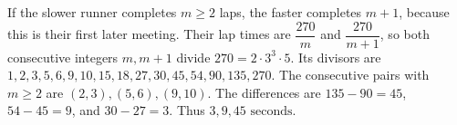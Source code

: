 If the slower runner completes $m\ge2$ laps, the faster completes $m+1$, because this is their first later meeting. Their lap times are $\dfrac{270}{m}$ and $\dfrac{270}{m+1}$, so both consecutive integers $m,m+1$ divide $270=2\cdot3^3\cdot5$. Its divisors are $1,2,3,5,6,9,10,15,18,27,30,45,54,90,135,270$. The consecutive pairs with $m\ge2$ are $(2,3),(5,6),(9,10)$. The differences are $135-90=45$, $54-45=9$, and $30-27=3$. Thus $\boxed{3,9,45\text{ seconds}}$.
